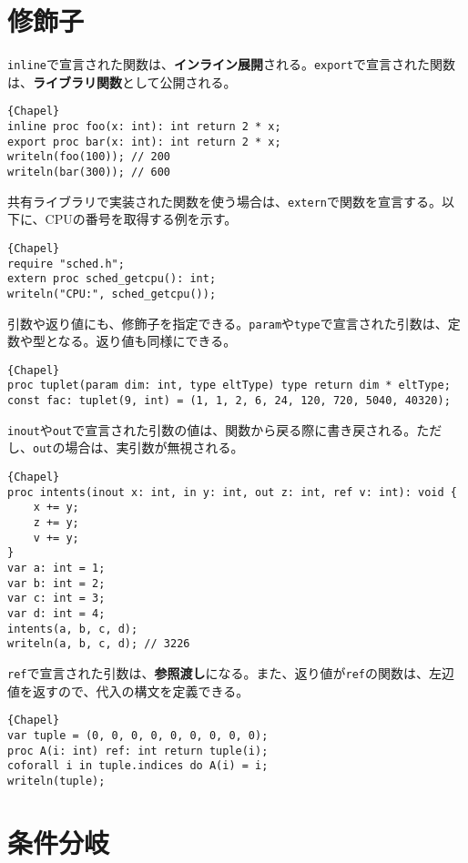 \documentclass[10pt,a4paper]{book}
\begin{document}
\section{修飾子}

\texttt{inline}で宣言された関数は、\textbf{インライン展開}される。\texttt{export}で宣言された関数は、\textbf{ライブラリ関数}として公開される。

\begin{Verbatim}{Chapel}
inline proc foo(x: int): int return 2 * x;
export proc bar(x: int): int return 2 * x;
writeln(foo(100)); // 200
writeln(bar(300)); // 600
\end{Verbatim}

共有ライブラリで実装された関数を使う場合は、\texttt{extern}で関数を宣言する。以下に、CPUの番号を取得する例を示す。

\begin{Verbatim}{Chapel}
require "sched.h";
extern proc sched_getcpu(): int;
writeln("CPU:", sched_getcpu());
\end{Verbatim}

引数や返り値にも、修飾子を指定できる。\texttt{param}や\texttt{type}で宣言された引数は、定数や型となる。返り値も同様にできる。

\begin{Verbatim}{Chapel}
proc tuplet(param dim: int, type eltType) type return dim * eltType;
const fac: tuplet(9, int) = (1, 1, 2, 6, 24, 120, 720, 5040, 40320);
\end{Verbatim}

\texttt{inout}や\texttt{out}で宣言された引数の値は、関数から戻る際に書き戻される。ただし、\texttt{out}の場合は、実引数が無視される。

\begin{Verbatim}{Chapel}
proc intents(inout x: int, in y: int, out z: int, ref v: int): void {
	x += y;
	z += y;
	v += y;
}
var a: int = 1;
var b: int = 2;
var c: int = 3;
var d: int = 4;
intents(a, b, c, d);
writeln(a, b, c, d); // 3226
\end{Verbatim}

\texttt{ref}で宣言された引数は、\textbf{参照渡し}になる。また、返り値が\texttt{ref}の関数は、左辺値を返すので、代入の構文を定義できる。

\begin{Verbatim}{Chapel}
var tuple = (0, 0, 0, 0, 0, 0, 0, 0, 0);
proc A(i: int) ref: int return tuple(i);
coforall i in tuple.indices do A(i) = i;
writeln(tuple);
\end{Verbatim}

\section{条件分岐}
\end{document}
